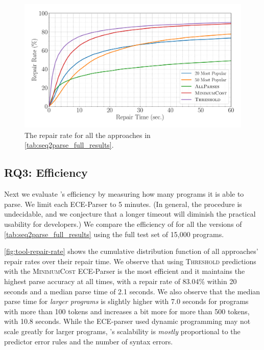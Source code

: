 \begin{figure}[t]
  \centering
  \includegraphics[width=0.85\linewidth]{tool-repair-rate.pdf}
  \caption{The repair rate for all the approaches in
  \autoref{tab:seq2parse_full_results}. }
  \label{fig:tool-repair-rate}
\end{figure}

\subsection{RQ3: Efficiency}
\label{sec:eval:efficiency}

Next we evaluate \toolname's efficiency by measuring how many programs it is
able to parse. We limit each ECE-Parser to 5 minutes. (In general, the procedure
is undecidable, and we conjecture that a longer timeout will diminish the
practical usability for developers.) We compare the efficiency of \toolname for
all the versions of \autoref{tab:seq2parse_full_results} using the full test set
of 15,000 programs.


\autoref{fig:tool-repair-rate} shows the cumulative distribution function of all
\toolname approaches' repair rates over their repair time. We observe that using
\textsc{Threshold} predictions with the \textsc{MinimumCost} ECE-Parser is the
most efficient and it maintains the highest parse accuracy at all times, with a
repair rate of 83.04\% within 20 seconds and a median parse time of 2.1 seconds.
We also observe that the median parse time for \emph{larger programs} is
slightly higher with 7.0 seconds for programs with more than 100 tokens and
increases a bit more for more than 500 tokens, with 10.8 seconds. While the
ECE-parser used dynamic programming may not scale greatly for larger programs,
\toolname's scalability is \emph{mostly} proportional to the predictor error
rules and the number of syntax errors.

